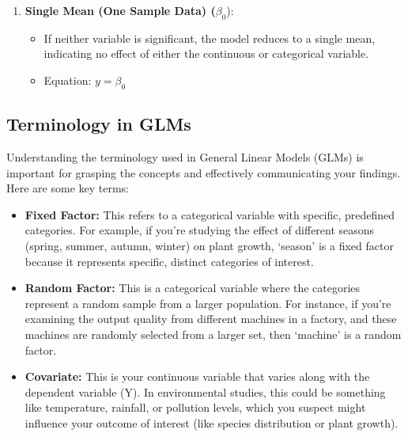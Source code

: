 \documentclass[
  letterpaper,
  DIV=11,
  numbers=noendperiod]{scrreprt}
\providecommand{\tightlist}{%
  \setlength{\itemsep}{0pt}\setlength{\parskip}{0pt}}
\begin{document}
\begin{enumerate}
  \begin{itemize}
  \tightlist
  \item
    If the continuous variable is not significant but the categorical
    variable is, the model effectively becomes a comparison of means
    between two groups (similar to a t-test).
  \item
    Equations:

    \begin{itemize}
    \tightlist
    \item
      For \(x_c = 0\): \(y = \beta_0\)
    \item
      For \(x_c = 1\): \(y = \beta_0 + \beta_2\)
    \end{itemize}
  \end{itemize}
\item
  \textbf{Single Mean (One Sample Data) (}\(\beta_0\)):

  \begin{itemize}
  \tightlist
  \item
    If neither variable is significant, the model reduces to a single
    mean, indicating no effect of either the continuous or categorical
    variable.
  \item
    Equation: \(y = \beta_0\)
  \end{itemize}
\end{enumerate}

\subsection{Terminology in GLMs}\label{terminology-in-glms}

Understanding the terminology used in General Linear Models (GLMs) is
important for grasping the concepts and effectively communicating your
findings. Here are some key terms:

\begin{itemize}
\item
  \textbf{Fixed Factor:} This refers to a categorical variable with
  specific, predefined categories. For example, if you're studying the
  effect of different seasons (spring, summer, autumn, winter) on plant
  growth, `season' is a fixed factor because it represents specific,
  distinct categories of interest.
\item
  \textbf{Random Factor:} This is a categorical variable where the
  categories represent a random sample from a larger population. For
  instance, if you're examining the output quality from different
  machines in a factory, and these machines are randomly selected from a
  larger set, then `machine' is a random factor.
\item
  \textbf{Covariate:} This is your continuous variable that varies along
  with the dependent variable (Y). In environmental studies, this could
  be something like temperature, rainfall, or pollution levels, which
  you suspect might influence your outcome of interest (like species
  distribution or plant growth).
\end{itemize}
\end{document}

